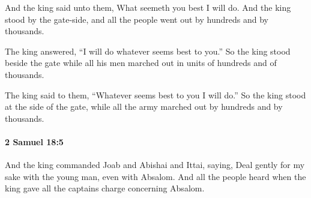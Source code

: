 			\begin{versebox}
					\item[BHS] 
					\item[ASV] And the king said unto them, What seemeth you best I will do. And the king stood by the gate-side, and all the people went out by hundreds and by thousands.
					\item[NIV] The king answered, “I will do whatever seems best to you.” So the king stood beside the gate while all his men marched out in units of hundreds and of thousands.
					\item[NRSV] The king said to them, “Whatever seems best to you I will do.” So the king stood at the side of the gate, while all the army marched out by hundreds and by thousands.
			\end{versebox}

		\paragraph{2 Samuel 18:5} %
			\label{2SAMUEL-18-5}

			And the king commanded Joab and Abishai and Ittai, saying, Deal gently for my sake with the young man, even with Absalom. And all the people heard when the king gave all the captains charge concerning Absalom.

